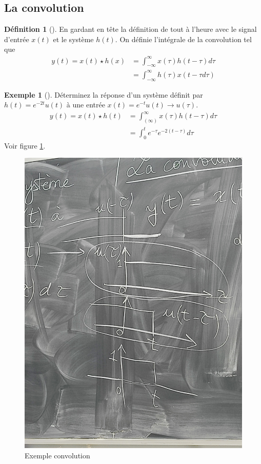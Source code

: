 \documentclass{article}
\theoremstyle{plain}%
\theoremstyle{definition}
\newtheorem{defn}{Définition}[section]
\newtheorem{exmp}{Exemple}[section]
\theoremstyle{remark}
\begin{document}
\subsection{La convolution}
\begin{defn}[]
    En gardant en tête la définition de tout à l'heure avec le signal d'entrée $ x(t) $ et le système $ h(t) $. On définie l'intégrale de la convolution tel que 
    \begin{align*}
        y(t) = x(t) \star h(x) &= \int_{-\infty}^{\infty } x(\tau  )h(t-\tau  ) d \tau  \\
        & = \int_{-\infty }^{\infty }h(\tau  )x(t-\tau    d \tau  )
    \end{align*}
\end{defn}
\begin{exmp}[]
    Déterminez la réponse d'un système définit par $ h(t) = e^{-2t} u(t)$  à une entrée $ x(t)=e^{-t}u(t) \to u(\tau ) $. 
    \begin{align*}
        y(t) = x(t) \star h(t) &= \int_{(\infty )}^{\infty } x(\tau )h(t-\tau )d \tau \\
        &= \int_{0}^{t}e^{-\tau }e^{-2(t-\tau )}d \tau 
    \end{align*}
    Voir figure \ref{exmp_conv_1}.
    \begin{figure}[!htbp]
        \centering
        \includegraphics[width=.60\textwidth]{./figures/fig1.jpg}
        \caption{Exemple convolution}
        \label{exmp_conv_1}
    \end{figure}
\end{exmp}
\end{document}
